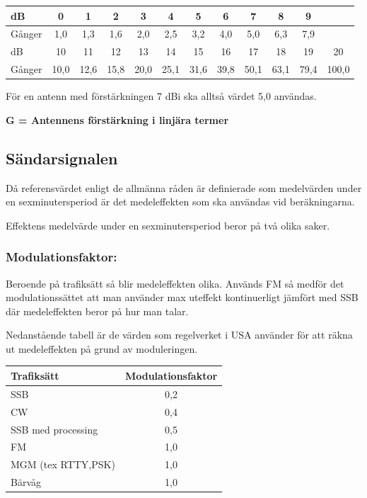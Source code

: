\begin{tabular}{|l|ccccccccccc|}
\hline
dB     &  0  &  1  &  2  &  3  &  4  &  5  &  6  &  7  &  8  &  9  & \\ \hline
Gånger & 1,0 & 1,3 & 1,6 & 2,0 & 2,5 & 3,2 & 4,0 & 5,0 & 6,3 & 7,9 & \\ \hline
dB     &  10  &  11  &  12  &  13  &  14  &  15  &  16  &  17  &  18  &  19  &  20 \\ \hline
Gånger & 10,0 & 12,6 & 15,8 & 20,0 & 25,1 & 31,6 & 39,8 & 50,1 & 63,1 & 79,4 & 100,0 \\ \hline
\end{tabular}

För en antenn med förstärkningen 7 dBi ska alltså värdet 5,0 användas.

\textbf{G = Antennens förstärkning i linjära termer}

\subsection{Sändarsignalen}

Då referensvärdet enligt de allmänna råden är definierade som
medelvärden under en sexminutersperiod är det medeleffekten som ska
användas vid beräkningarna.

Effektens medelvärde under en sexminutersperiod beror på två olika saker.

\subsubsection{Modulationsfaktor:}

Beroende på trafiksätt så blir medeleffekten olika. Används FM så medför
det modulationssättet att man använder max uteffekt kontinuerligt
jämfört med SSB där medeleffekten beror på hur man talar.

Nedanstående tabell är de värden som regelverket i USA använder för
att räkna ut medeleffekten på grund av moduleringen.

\begin{tabular}{|l|c|}
\hline
Trafiksätt & Modulationsfaktor \\ \hline
SSB & 0,2 \\ \hline
CW & 0,4 \\ \hline
SSB med processing & 0,5 \\ \hline
FM & 1,0 \\ \hline
MGM (tex RTTY,PSK) & 1,0 \\ \hline
Bärvåg & 1,0 \\ \hline
\end{tabular}

